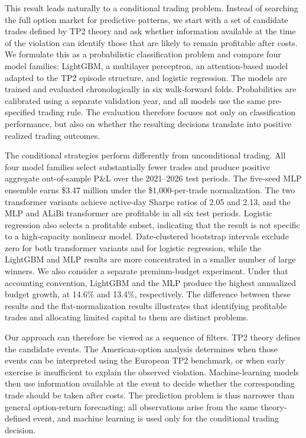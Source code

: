 \documentclass[sigconf,review,anonymous]{acmart}
\begin{document}
This result leads naturally to a conditional trading problem. Instead of searching the full option market for predictive patterns, we start with a set of candidate trades defined by TP2 theory and ask whether information available at the time of the violation can identify those that are likely to remain profitable after costs. We formulate this as a probabilistic classification problem and compare four model families: LightGBM, a multilayer perceptron, an attention-based model adapted to the TP2 episode structure, and logistic regression. The models are trained and evaluated chronologically in six walk-forward folds. Probabilities are calibrated using a separate validation year, and all models use the same pre-specified trading rule. The evaluation therefore focuses not only on classification performance, but also on whether the resulting decisions translate into positive realized trading outcomes.

The conditional strategies perform differently from unconditional trading. All four model families select substantially fewer trades and produce positive aggregate out-of-sample P\&L over the 2021--2026 test periods. The five-seed MLP ensemble earns \$3.47 million under the \$1{,}000-per-trade normalization. The two transformer variants achieve active-day Sharpe ratios of 2.05 and 2.13, and the MLP and ALiBi transformer are profitable in all six test periods. Logistic regression also selects a profitable subset, indicating that the result is not specific to a high-capacity nonlinear model. Date-clustered bootstrap intervals exclude zero for both transformer variants and for logistic regression, while the LightGBM and MLP results are more concentrated in a smaller number of large winners. We also consider a separate premium-budget experiment. Under that accounting convention, LightGBM and the MLP produce the highest annualized budget growth, at 14.6\% and 13.4\%, respectively. The difference between these results and the flat-normalization results illustrates that identifying profitable trades and allocating limited capital to them are distinct problems.

Our approach can therefore be viewed as a sequence of filters. TP2 theory defines the candidate events. The American-option analysis determines when those events can be interpreted using the European TP2 benchmark, or when early exercise is insufficient to explain the observed violation. Machine-learning models then use information available at the event to decide whether the corresponding trade should be taken after costs. The prediction problem is thus narrower than general option-return forecasting: all observations arise from the same theory-defined event, and machine learning is used only for the conditional trading decision.
\end{document}
